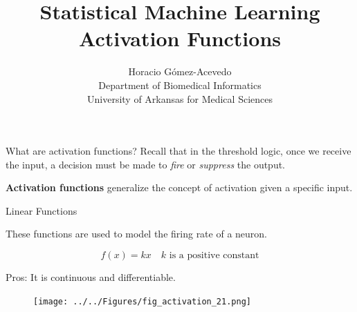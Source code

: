 \documentclass{beamer}
\title{Statistical Machine Learning\\ Activation Functions}
\author{Horacio G\'omez-Acevedo\\ Department of Biomedical Informatics\\
	University of Arkansas for Medical Sciences}
\begin{document}
	\begin{frame}[plain]
		\maketitle
	\end{frame}

\begin{frame}{What are activation functions?}
Recall that in the threshold logic,  once we receive the input, a decision must be made to \textit{fire} or \textit{suppress} the output. 


\textbf{Activation functions} generalize the concept of activation given a specific  input.

	
\end{frame}

\begin{frame}{Linear Functions}
	
	These functions are used to model the firing rate of a neuron.
	
	\begin{equation*}
		f(x)= kx \quad k \text{ is a positive constant}
	\end{equation*}

Pros: It is continuous and differentiable.	

\begin{figure}[h]
	\centering
	\texttt{[image: ../../Figures/fig\_activation\_21.png]}
\end{figure}

	
\end{frame}
\end{document}
